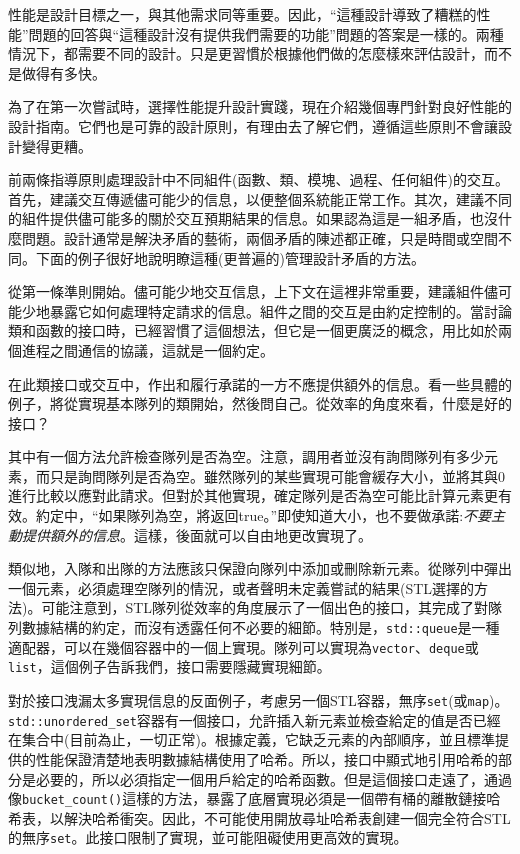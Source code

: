 
性能是設計目標之一，與其他需求同等重要。因此，“這種設計導致了糟糕的性能”問題的回答與“這種設計沒有提供我們需要的功能”問題的答案是一樣的。兩種情況下，都需要不同的設計。只是更習慣於根據他們做的怎麼樣來評估設計，而不是做得有多快。

為了在第一次嘗試時，選擇性能提升設計實踐，現在介紹幾個專門針對良好性能的設計指南。它們也是可靠的設計原則，有理由去了解它們，遵循這些原則不會讓設計變得更糟。 

前兩條指導原則處理設計中不同組件(函數、類、模塊、過程、任何組件)的交互。首先，建議交互傳遞儘可能少的信息，以便整個系統能正常工作。其次，建議不同的組件提供儘可能多的關於交互預期結果的信息。如果認為這是一組矛盾，也沒什麼問題。設計通常是解決矛盾的藝術，兩個矛盾的陳述都正確，只是時間或空間不同。下面的例子很好地說明瞭這種(更普遍的)管理設計矛盾的方法。


從第一條準則開始。儘可能少地交互信息，上下文在這裡非常重要，建議組件儘可能少地暴露它如何處理特定請求的信息。組件之間的交互是由約定控制的。當討論類和函數的接口時，已經習慣了這個想法，但它是一個更廣泛的概念，用比如於兩個進程之間通信的協議，這就是一個約定。 

在此類接口或交互中，作出和履行承諾的一方不應提供額外的信息。看一些具體的例子，將從實現基本隊列的類開始，然後問自己。從效率的角度來看，什麼是好的接口？

其中有一個方法允許檢查隊列是否為空。注意，調用者並沒有詢問隊列有多少元素，而只是詢問隊列是否為空。雖然隊列的某些實現可能會緩存大小，並將其與0進行比較以應對此請求。但對於其他實現，確定隊列是否為空可能比計算元素更有效。約定中，“如果隊列為空，將返回true。”即使知道大小，也不要做承諾:\textit{不要主動提供額外的信息}。這樣，後面就可以自由地更改實現了。 

類似地，入隊和出隊的方法應該只保證向隊列中添加或刪除新元素。從隊列中彈出一個元素，必須處理空隊列的情況，或者聲明未定義嘗試的結果(STL選擇的方法)。可能注意到，STL隊列從效率的角度展示了一個出色的接口，其完成了對隊列數據結構的約定，而沒有透露任何不必要的細節。特別是，\texttt{std::queue}是一種適配器，可以在幾個容器中的一個上實現。隊列可以實現為\texttt{vector}、\texttt{deque}或\texttt{list}，這個例子告訴我們，接口需要隱藏實現細節。

對於接口洩漏太多實現信息的反面例子，考慮另一個STL容器，無序\texttt{set}(或\texttt{map})。\texttt{std::unor\break dered\_set}容器有一個接口，允許插入新元素並檢查給定的值是否已經在集合中(目前為止，一切正常)。根據定義，它缺乏元素的內部順序，並且標準提供的性能保證清楚地表明數據結構使用了哈希。所以，接口中顯式地引用哈希的部分是必要的，所以必須指定一個用戶給定的哈希函數。但是這個接口走遠了，通過像\texttt{bucket\_count()}這樣的方法，暴露了底層實現必須是一個帶有桶的離散鏈接哈希表，以解決哈希衝突。因此，不可能使用開放尋址哈希表創建一個完全符合STL的無序\texttt{set}。此接口限制了實現，並可能阻礙使用更高效的實現。

